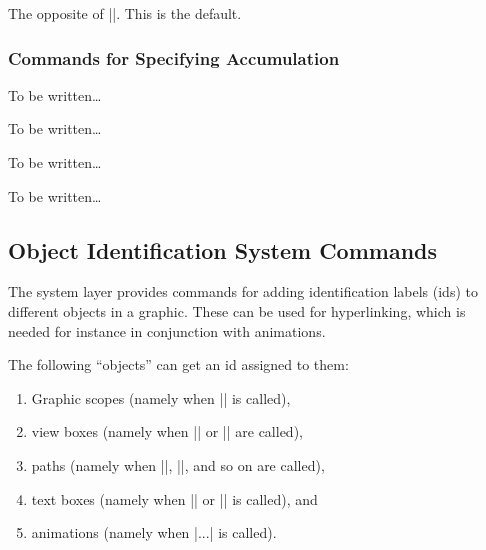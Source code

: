 \begin{command}{\pgfsys@animation@removeatend{}}
  The opposite of |\pgfsys@animation@freezeatend|. This is the default.
\end{command}

\subsubsection{Commands for Specifying Accumulation}
\label{section-value-types}


\begin{command}{\pgfsys@animation@sum{}}
  To be written\dots
\end{command}

\begin{command}{\pgfsys@animation@replace{}}
  To be written\dots
\end{command}

\begin{command}{\pgfsys@animation@accumulate{}}
  To be written\dots
\end{command}

\begin{command}{\pgfsys@animation@noaccumulate{}}
  To be written\dots
\end{command}






\subsection{Object Identification System Commands}
\label{section-sys-id}

The system layer provides commands for adding identification labels
(ids) to different objects in a graphic. These can be used for
hyperlinking, which is needed for instance in conjunction with
animations.

The following ``objects'' can get an id assigned to them:
\begin{enumerate}
\item Graphic scopes (namely when |\pgfsys@begin@idscope| is called),
\item view boxes (namely when |\pgfsys@viewboxmeet| or |\pgfsys@viewboxslice| are called),
\item paths (namely when |\pgfsys@fill|, |\pgfsys@stroke|, and so on are called),
\item text boxes (namely when |\pgfsys@hbox| or |\pgfsys@hboxsynced| is called), and
\item animations (namely when |\pgfsys@animate...| is called).
\end{enumerate}


